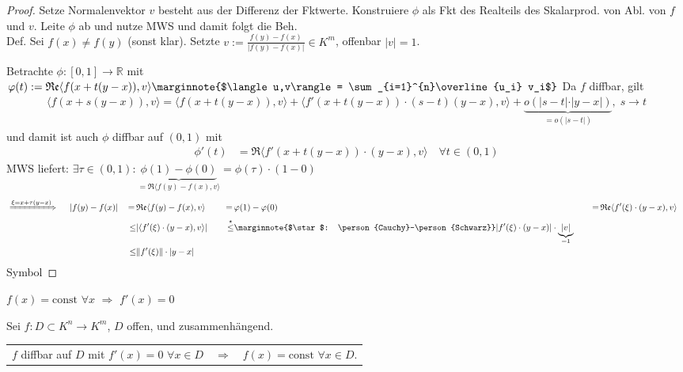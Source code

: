 \begin{proof}
	Setze Normalenvektor $v$ besteht aus der Differenz der Fktwerte. Konstruiere $\phi$ als Fkt des Realteils des Skalarprod. von Abl. von $f$ und $v$. Leite $\phi$ ab und nutze MWS und damit folgt die Beh.  \\
	Def.
	\NoEndMark
	Sei $f(x) \neq f(y)$ (sonst klar). Setzte $v:= \frac{f(y) - f(x)}{\vert f(y) - f(x)\vert} \in K^m$, offenbar $\vert v \vert = 1$.
	
	Betrachte $\phi: [0,1]  \to\mathbb{R}$ mit $\phi(t) := \Re \langle f(x + t (y - x)), v\rangle\marginnote{$\langle u,v\rangle = \sum_{i=1}^{n}\overline{u_i} v_i$}$
	Da $f$ \gls{diffbar}, gilt \begin{align*}
		\langle f(x + s(y - x)), v\rangle = \langle f(x + t(y - x)), v\rangle + \langle f'(x + t(y - x))\cdot (s  - t)(y - x), v \rangle + \underbrace{o(\vert s -  t\vert \cdot \vert y - x\vert)}_{=o(\vert s - t\vert)}, \; s\to t
	\end{align*} und damit ist auch $\phi$ \gls{diffbar} auf $(0,1)$ mit \begin{align*}
		\phi'(t) &= \Re \langle f'(x + t(y - x))\cdot (y - x), v \rangle \quad \forall t\in (0,1)
	\end{align*}
	MWS liefert: $\exists \tau \in (0,1): \underbrace{\phi(1) - \phi(0)}_{=\Re \langle f(y) - f(x), v\rangle} = \phi(\tau) \cdot (1 - 0)$ \\
	\begin{alignat*}{8}
		&\xRightarrow{\xi = x + \tau (y - x)}\;\;& \vert f(y) - f(x) \vert &&\,=\,& \Re \langle f(y) - f(x), v \rangle &&&\,=\,& \phi(1) - \phi(0) &&&\,=\,& \Re \langle f'(\xi) \cdot (y - x), v\rangle& \\
		&& &&\le& \vert \langle f'(\xi) \cdot (y - x), v \rangle \vert& &&\overset{\star}{\le}&\marginnote{$\star$: \person{Cauchy}-\person{Schwarz}} \vert f'(\xi) \cdot (y - x)\vert \cdot \underbrace{\vert v \vert}_{=1}&  \\
		&& &&\le& \Vert f'(\xi) \Vert \cdot \vert y - x\vert&
	\end{alignat*} \hfill\csname\InTheoType Symbol\endcsname
\end{proof}

\begin{boldenvironment}[bekanntlich]
	$f(x) = \mathrm{const}$ $\forall x$ $\Rightarrow$ $f'(x) = 0$
\end{boldenvironment}

\begin{proposition}
	Sei $f:D\subset K^n\to K^m$, $D$ offen, und zusammenhängend.
	
	\begin{tabularx}{\linewidth}{XcX}
		\hfill$f$ \gls{diffbar} auf $D$ mit $f'(x) = 0$ $\forall x\in D$ & $\Rightarrow$ & $f(x) = \mathrm{const}$ $\forall x\in D$.
	\end{tabularx}
\end{proposition}

